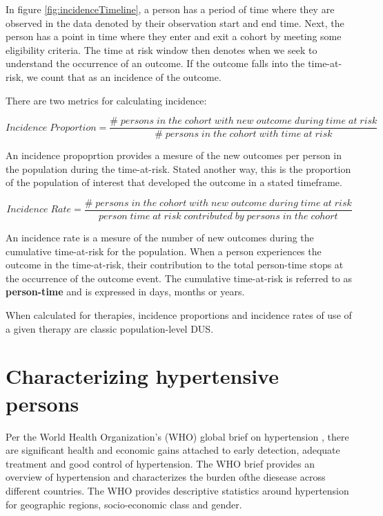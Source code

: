 \documentclass[11pt]{book}
\theoremstyle{definition}
\theoremstyle{definition}
\theoremstyle{definition}
\theoremstyle{remark}
\begin{document}
In figure \ref{fig:incidenceTimeline}, a person has a period of time where they are observed in the data denoted by their observation start and end time. Next, the person has a point in time where they enter and exit a cohort by meeting some eligibility criteria. The time at risk window then denotes when we seek to understand the occurrence of an outcome. If the outcome falls into the time-at-risk, we count that as an incidence of the outcome.

There are two metrics for calculating incidence:

\begin{equation} 
Incidence\;Proportion = \frac{\#\;persons\;in\;the\;cohort\;with\;new\;outcome\;during\;time\;at\;risk}{\#\;persons\;in\;the\;cohort\;with\;time\;at\;risk}
\end{equation}

An incidence propoprtion provides a mesure of the new outcomes per person in the population during the time-at-risk. Stated another way, this is the proportion of the population of interest that developed the outcome in a stated timeframe.

\begin{equation} 
Incidence\;Rate = \frac{\#\;persons\;in\;the\;cohort\;with\;new\;outcome\;during\;time\;at\;risk}{person\;time\;at\;risk\;contributed\;by\;persons\;in\;the\;cohort}
\end{equation}

An incidence rate is a mesure of the number of new outcomes during the cumulative time-at-risk for the population. When a person experiences the outcome in the time-at-risk, their contribution to the total person-time stops at the occurrence of the outcome event. The cumulative time-at-risk is referred to as \textbf{person-time} and is expressed in days, months or years.

When calculated for therapies, incidence proportions and incidence rates of use of a given therapy are classic population-level DUS.

\hypertarget{characterizing-hypertensive-persons}{%
\section{Characterizing hypertensive persons}\label{characterizing-hypertensive-persons}}

Per the World Health Organization's (WHO) global brief on hypertension \citep{WHOHypertension}, there are significant health and economic gains attached to early detection, adequate treatment and good control of hypertension. The WHO brief provides an overview of hypertension and characterizes the burden ofthe diesease across different countries. The WHO provides descriptive statistics around hypertension for geographic regions, socio-economic class and gender.
\end{document}
